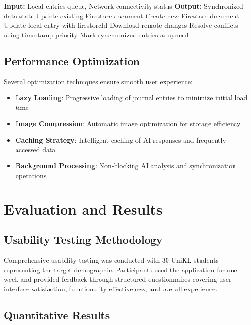 \documentclass[conference]{IEEEtran}
\begin{document}
{\begin{IEEEkeywords}
\begin{algorithmic}
\STATE \textbf{Input:} Local entries queue, Network connectivity status
\STATE \textbf{Output:} Synchronized data state
            \STATE Update existing Firestore document
        \ELSE
            \STATE Create new Firestore document
            \STATE Update local entry with firestoreId
        \ENDIF
    \ENDFOR
    \STATE Download remote changes
    \STATE Resolve conflicts using timestamp priority
\ENDIF
\STATE Mark synchronized entries as synced
\end{algorithmic}

\subsection{Performance Optimization}

Several optimization techniques ensure smooth user experience:
\begin{itemize}
\item \textbf{Lazy Loading}: Progressive loading of journal entries to minimize initial load time
\item \textbf{Image Compression}: Automatic image optimization for storage efficiency
\item \textbf{Caching Strategy}: Intelligent caching of AI responses and frequently accessed data
\item \textbf{Background Processing}: Non-blocking AI analysis and synchronization operations
\end{itemize}

\section{Evaluation and Results}

\subsection{Usability Testing Methodology}

Comprehensive usability testing was conducted with 30 UniKL students representing the target demographic. Participants used the application for one week and provided feedback through structured questionnaires covering user interface satisfaction, functionality effectiveness, and overall experience.

\subsection{Quantitative Results}


\end{IEEEkeywords}}
\end{document}
